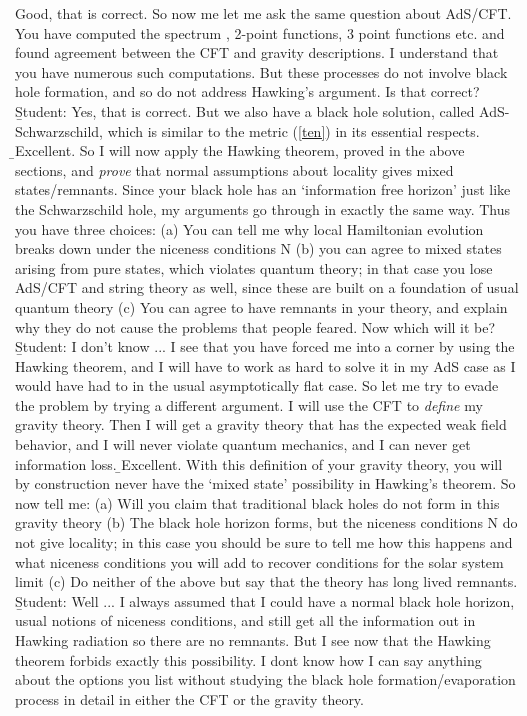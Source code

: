 \documentclass[12pt]{article}
\begin{document}
\hb Good, that is correct. So now me let me ask the same question about AdS/CFT. You have computed the spectrum , 2-point functions, 3 point functions etc. and found agreement between the CFT and gravity descriptions. I understand that you have numerous such computations. But these processes do not involve black hole formation, and so do not address Hawking's argument. Is that correct?
\b
Student: Yes, that is correct. But we also have a black hole solution, called AdS-Schwarzschild, which is similar to the metric (\ref{ten}) in its essential respects.
\b
\hb Excellent. So I will now apply the Hawking theorem, proved in the above sections, and {\it prove} that normal assumptions about locality gives mixed states/remnants. Since your black hole has an `information free horizon' just like the Schwarzschild hole, my arguments go through in exactly the same way. Thus you have three choices:  (a) You can tell me why local Hamiltonian evolution breaks down under the niceness conditions N (b) you can  agree to mixed states arising from pure states, which violates quantum theory; in that case you lose AdS/CFT and string theory as well, since these are built on a foundation of usual quantum theory (c) You can agree to have remnants in your theory, and explain why they do not cause the problems that people feared. Now which will it be?
\b
Student: I don't know ... I see that you have forced me into a corner by using the Hawking theorem, and I will have to work as hard to solve it in my AdS case as I would have had to in the usual asymptotically flat case. So let me try to evade the problem by trying a different argument. I will use the CFT to {\it define} my gravity theory. Then I will get a gravity theory that has the expected weak field behavior, and I will never violate quantum mechanics, and I can never get information loss.
\b
\hb Excellent. With this definition of your gravity theory, you will by construction never have the `mixed state' possibility in Hawking's theorem. So now tell me: (a) Will you claim that traditional black holes do not form in this gravity theory (b) The black hole horizon forms, but the niceness conditions N do not give locality; in this case you should be sure to tell me how this happens and what niceness conditions you will add to recover conditions for the solar system limit (c) Do neither of the above but say that the theory has long lived remnants.
\b
Student: Well ... I always assumed that I could have a normal black hole horizon, usual notions of niceness conditions, and still get all the information out in Hawking radiation so there are no remnants. But I see now that the Hawking theorem forbids exactly this possibility. I dont know how I can say anything about the options you list without studying the black hole formation/evaporation process in detail in either the CFT or the gravity theory.
\end{document}
